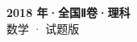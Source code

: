 \documentclass[zihao=-4, a4paper]{ctexart}
\begin{document}
\begin{center}
  {\Large\bfseries 2018 年·全国Ⅱ卷·理科}\\[4pt]
  {\large 数学 · 试题版}
\end{center}
\medskip
{}

\end{document}
